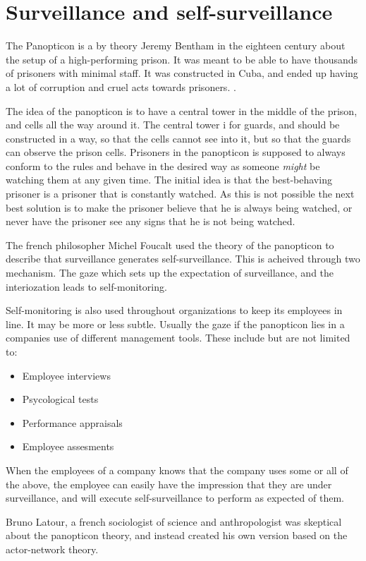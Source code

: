 \section{Surveillance and self-surveillance}
The Panopticon is a by theory Jeremy Bentham in the eighteen century about the setup of a high-performing prison. It was meant to be able to have thousands of prisoners with minimal staff. It was constructed in Cuba, and ended up having a lot of corruption and cruel acts towards prisoners. \cite{website:panopticon-idea}.

The idea of the panopticon is to have a central tower in the middle of the prison, and cells all the way around it. The central tower i for guards, and should be constructed in a way, so that the cells cannot see into it, but so that the guards can observe the prison cells. Prisoners in the panopticon is supposed to always conform to the rules and behave in the desired way as someone \textit{might} be watching them at any given time. The initial idea is that the best-behaving prisoner is a prisoner that is constantly watched. As this is not possible the next best solution is to make the prisoner believe that he is always being watched, or never have the prisoner see any signs that he is not being watched.\cite[P. 250]{bookref:organization-theory}

The french philosopher Michel Foucalt used the theory of the panopticon to describe that surveillance generates self-surveillance. This is acheived through two mechanism. The gaze which sets up the expectation of surveillance, and the interiozation leads to self-monitoring.

Self-monitoring is also used throughout organizations to keep its employees in line. It may be more or less subtle.\cite[P. 251]{bookref:organization-theory} Usually the gaze if the panopticon lies in a companies use of different management tools. These include but are not limited to:
\begin{itemize}
  \item{Employee interviews}
  \item{Psycological tests}
  \item{Performance appraisals}
  \item{Employee assesments}
\end{itemize}

When the employees of a company knows that the company uses some or all of the above, the employee can easily have the impression that they are under surveillance, and will execute self-surveillance to perform as expected of them.\cite[P. 251]{bookref:organization-theory}

Bruno Latour, a french sociologist of science and anthropologist was skeptical about the panopticon theory, and instead created his own version based on the actor-network theory.
